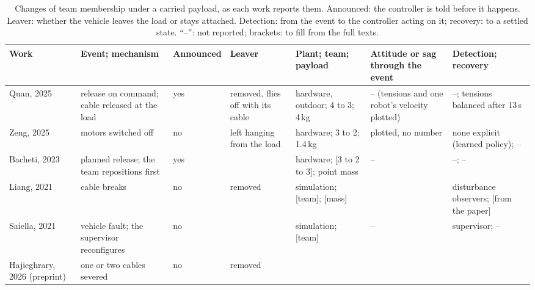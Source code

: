 \begin{table}[htbp]
\centering
\footnotesize
\setlength{\tabcolsep}{3pt}
\caption[Changes of team membership under a carried payload]{Changes of team membership under a carried
payload, as each work reports them. Announced: the controller is told before it happens. Leaver: whether the vehicle
leaves the load or stays attached. Detection: from the event to the controller acting on it; recovery: to a settled
state. ``--'': not reported; brackets: to fill from the full texts.}
\label{tab:membership}
\begin{tabularx}{\textwidth}{@{}
  >{\raggedright\arraybackslash\hsize=0.86\hsize}X
  >{\raggedright\arraybackslash\hsize=1.04\hsize}X
  >{\raggedright\arraybackslash\hsize=0.78\hsize}X
  >{\raggedright\arraybackslash\hsize=0.90\hsize}X
  >{\raggedright\arraybackslash\hsize=1.04\hsize}X
  >{\raggedright\arraybackslash\hsize=1.14\hsize}X
  >{\raggedright\arraybackslash\hsize=1.24\hsize}X@{}}
\toprule
Work & Event; mechanism & Announced & Leaver & Plant; team; payload & Attitude or sag through the event &
Detection; recovery \\
\midrule
Quan\newline \cite{quan2025swarm}, 2025 & release on command; cable released at the load & yes & removed, flies off with
its cable & hardware, outdoor; 4 to 3; 4\,kg & -- (tensions and one robot's velocity plotted) & --; tensions
balanced after 13\,s \\
\addlinespace
Zeng\newline \cite{zeng2025marl}, 2025 & motors switched off & no & left hanging from the load & hardware; 3 to 2;
1.4\,kg & plotted, no number & none explicit (learned policy); -- \\
\addlinespace
Bacheti\newline \cite{tensionbased}, 2023 & planned release; the team repositions first & yes & [removed; count to
verify] & hardware; [3 to 2 to 3]; point mass & -- & --; -- \\
\addlinespace
Liang\newline \cite{liang2021fault}, 2021 & cable breaks & no & removed & simulation; [team]; [mass] & [from the paper] &
disturbance observers; [from the paper] \\
\addlinespace
Saiella\newline \cite{saiella2021fault}, 2021 & vehicle fault; the supervisor reconfigures & no & [from the paper] &
simulation; [team] & -- & supervisor; -- \\
\addlinespace
Hajieghrary\newline \cite{hajieghrary2026passive}, 2026 (preprint) & one or two cables severed & no & removed &

\end{tabularx}
\end{table}
